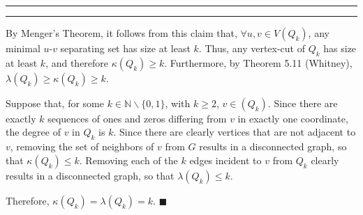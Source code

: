 \documentclass[11pt]{article}
\newcounter{questionCounter}
\newcounter{partCounter}[questionCounter]
\newenvironment{question}[2][\arabic{questionCounter}]{%
    \setcounter{partCounter}{0}%
    \vspace{.25in} \hrule \vspace{0.5em}%
        \noindent{\bf #2}%
    \vspace{0.8em} \hrule \vspace{.10in}%
    \addtocounter{questionCounter}{1}%
}{}
\begin{document}
\begin{question}{Problem 1}
By Menger's Theorem, it follows from this claim that,
$\forall u,v \in V(Q_k)$, any minimal $u$-$v$ separating set has size at least
$k$. Thus, any vertex-cut of $Q_k$ has size at least $k$, and therefore
$\kappa(Q_k) \geq k$. Furthermore, by Theorem 5.11 (Whitney),
$\lambda(Q_k) \geq \kappa(Q_k) \geq k$.

Suppose that, for some $k \in \mathbb{N}\backslash\{0,1\}$, with $k \geq 2$,
$v \in (Q_k)$. Since there are exactly $k$ sequences of ones and zeros
differing from $v$ in exactly one coordinate, the degree of $v$ in $Q_k$ is
$k$. Since there are clearly vertices that are not adjacent to $v$, removing
the set of neighbors of $v$ from $G$ results in a disconnected graph, so that
$\kappa(Q_k) \leq k$. Removing each of the $k$ edges incident to $v$ from
$Q_k$ clearly results in a disconnected graph, so that $\lambda(Q_k) \leq k$.

Therefore, $\kappa(Q_k) = \lambda(Q_k) = k$. \qquad $\blacksquare$
\end{question}
\end{document}
